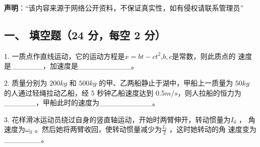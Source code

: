 
\textbf{声明}：“该内容来源于网络公开资料，不保证真实性，如有侵权请联系管理员”

\subsection{一、 填空题（24 分，每空 2 分）}
1. 一质点作直线运动，它的运动方程是$x=bt-ct^2$,$b,c$是常数，则此质点的
速度是______，加速度是__________。

2. 质量分别为 $200kg$ 和 $500kg$ 的甲、乙两船静止于湖中，甲船上一质量为 $50kg$
的人通过轻绳拉动乙船，经 5 秒钟乙船速度达到 $0.5m/s$，则人拉船的恒力为
______，甲船此时的速度为__________。

3. 花样滑冰运动员绕过自身的竖直轴运动，开始时两臂伸开，转动惯量为$I_0$ ，
角速度为$\omega_0$ 。然后她将两臂收回，使转动惯量减少为$\frac{I_0}{2}$ ，这时她转动的角
速度变为_______。